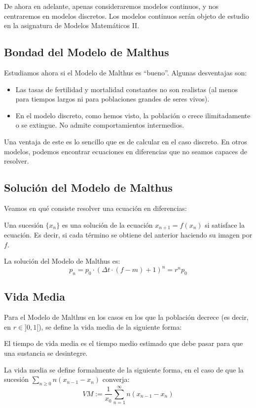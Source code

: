 De ahora en adelante, apenas consideraremos modelos continuos, y nos centraremos en modelos discretos. Los modelos continuos serán objeto de estudio en la asignatura de Modelos Matemáticos II.

\subsection{Bondad del Modelo de Malthus}
Estudiamos ahora si el Modelo de Malthus es ``bueno''. Algunas desventajas son:
\begin{itemize}
    \item Las tasas de fertilidad y mortalidad constantes no son realistas (al menos para tiempos largos ni para poblaciones grandes de seres vivos).
    \item En el modelo discreto, como hemos visto, la población o crece ilimitadamente o se extingue. No admite comportamientos intermedios.
\end{itemize}
Una ventaja de este es lo sencillo que es de calcular en el caso discreto. En otros modelos, podemos encontrar ecuaciones en diferencias que no seamos capaces de resolver.

\subsection{Solución del Modelo de Malthus}

Veamos en qué consiste resolver una ecuación en diferencias:
\begin{definicion}
    Una sucesión $\{x_n\}$ es una solución de la ecuación $x_{n+1} = f(x_n)$ si satisface la ecuación.
    Es decir, si cada término se obtiene del anterior haciendo su imagen por $f$.
\end{definicion}

La solución del Modelo de Malthus es:
\begin{equation*}
    p_{n} = p_0 \cdot \left(\Delta t \cdot (f-m)+1\right)^n = r^np_0
\end{equation*}


\subsection{Vida Media}

Para el Modelo de Malthus en los casos en los que la población decrece (es decir, en $r\in ]0,1[$), se define la vida media de la siguiente forma:
\begin{definicion}
    El tiempo de vida media es el tiempo medio estimado que debe pasar para que una sustancia se desintegre.

    La vida media se define formalmente de la siguiente forma, en el caso de que la sucesión $\sum_{n\geq 0} n(x_{n-1}-x_n)$ converja:
    $$VM := \dfrac{1}{x_0}\sum_{n = 1}^{\infty} n(x_{n-1}-x_n)$$
\end{definicion}

